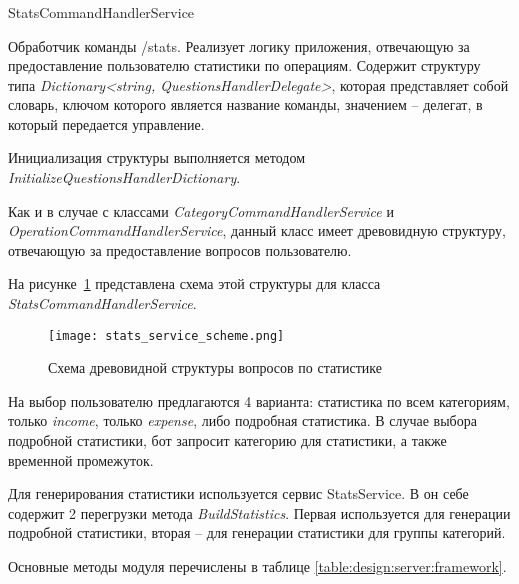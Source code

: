 \subsubsection{} StatsCommandHandlerService
\label{sec:design:server:StatsCommandHandlerService}

Обработчик команды /stats. Реализует логику приложения, отвечающую за предоставление пользователю статистики по операциям. Содержит структуру типа \emph{Dictionary<string, QuestionsHandlerDelegate>}, которая представляет собой словарь, ключом которого является название команды, значением – делегат, в который передается управление.

Инициализация структуры выполняется методом \linebreak \emph{InitializeQuestionsHandlerDictionary}.

Как и в случае с классами \emph{CategoryCommandHandlerService} и \linebreak \emph{OperationCommandHandlerService}, данный класс имеет древовидную структуру, отвечающую за предоставление вопросов пользователю.

На рисунке~\ref{fig:design:server:stats_service_scheme} представлена схема этой структуры для класса \linebreak \emph{StatsCommandHandlerService}.

\begin{figure}[!h]
\centering
	\texttt{[image: stats\_service\_scheme.png]}
	\caption{Схема древовидной структуры вопросов по статистике}
	\label{fig:design:server:stats_service_scheme}
\end{figure}

На выбор пользователю предлагаются 4 варианта: статистика по всем категориям, только \emph{income}, только \emph{expense}, либо подробная статистика. В случае выбора подробной статистики, бот запросит категорию для статистики, а также временной промежуток.

Для генерирования статистики используется сервис StatsService. В он себе содержит 2 перегрузки метода \emph{BuildStatistics}. Первая используется для генерации подробной статистики, вторая – для
генерации статистики для группы категорий.

Основные методы модуля перечислены в таблице \ref{table:design:server:framework}.

